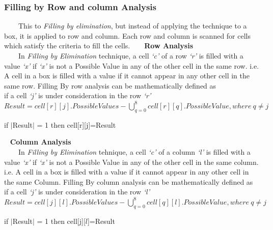 \documentclass[12pt,a4paper]{article}
\begin{document}
\subsubsection{Filling by Row and column Analysis}
\ \ \ \ This to \textit{Filling by elimination}, but instead of applying the technique to a box, it is applied to row and column. Each row and column is scanned for cells which satisfy the criteria to fill the cells. 
\ \newline
\ \newline
\textbf{Row Analysis}\\
\ \ \ \ In \textit{Filling by Elimination} technique, a cell \textit{`c'} of a row \textit{`r'} is filled with a value \textit{`x'} if \textit{`x'} is not a Possible Value in any of the other cell in the same row. i.e. A cell in a box is filled with a value if it cannot appear in any other cell in the same row. Filling By row analysis can be mathematically defined as\\

if a cell \textit{`j'} is under consideration in the row \textit{`r'}\\

$Result = cell[r][j].PossibleValues - \bigcup\limits_{q=0}^8 cell[r][q].PossibleValue, where\  q \neq j $

if $\vert$Result$\vert$ = 1 then cell[r][j]=Result

\ \newline
\textbf{Column Analysis}\\
\ \ \ \ In \textit{Filling by Elimination} tehnique, a cell \textit{`c'} of a column \textit{`l'} is filled with a value \textit{`x'} if \textit{`x'} is not a Possible Value in any of the other cell in the same column. i.e. A cell in a box is filled with a value if it cannot appear in any other cell in the same Column. Filling By column analysis can be mathematically defined as\\

if a cell \textit{`j'} is under consideration in the row \textit{`l'}\\

$Result = cell[j][l].PossibleValues - \bigcup\limits_{q=0}^8 cell[q][l].PossibleValue, where\  q \neq j $

if $\vert$Result$\vert$ = 1 then cell[j][$l$]=Result
\end{document}
